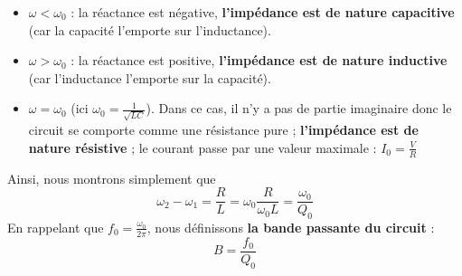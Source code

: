\documentclass[12pt,a4paper]{article}
\begin{document}
\begin{itemize}
	\item 	$\omega < \omega_0$ : la réactance est négative, \textbf{l'impédance est de nature capacitive} (car la capacité l'emporte sur l'inductance).
	\item 	$\omega > \omega_0$ : la réactance est positive, \textbf{l'impédance est de nature inductive} (car l'inductance l'emporte sur la capacité).
	\item 	$\omega = \omega_0$ (ici $\omega_0 = \frac{1}{\sqrt{LC}}$). Dans ce cas, il n'y a pas de partie imaginaire donc le circuit se comporte comme une résistance pure ; \textbf{l'impédance est de nature résistive} ; le courant passe par une valeur maximale : $I_0 = \frac{V}{R}$
\end{itemize}

Ainsi, nous montrons simplement que 
\begin{equation}
	\omega_2 - \omega_1 = \frac{R}{L} = \omega_0 \frac{R}{\omega_0 L} = \frac{\omega_0}{Q_0}
\end{equation}
En rappelant que $f_0 = \frac{\omega_0}{2\pi}$, nous définissons \textbf{la bande passante du circuit} :
\begin{equation}
	B = \frac{f_0}{Q_0}
\end{equation}
\end{document}
